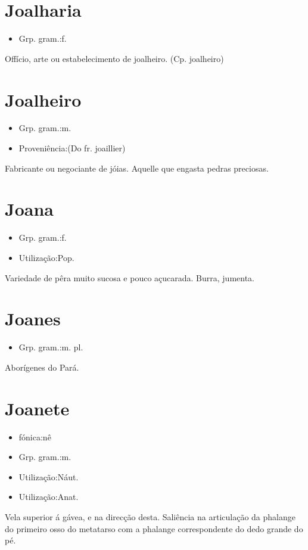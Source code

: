 \documentclass{article}
\begin{document}
\section{Joalharia}
\begin{itemize}
\item {Grp. gram.:f.}
\end{itemize}
Offício, arte ou estabelecimento de joalheiro.
(Cp. \textunderscore joalheiro\textunderscore )
\section{Joalheiro}
\begin{itemize}
\item {Grp. gram.:m.}
\end{itemize}
\begin{itemize}
\item {Proveniência:(Do fr. \textunderscore joaillier\textunderscore )}
\end{itemize}
Fabricante ou negociante de jóias.
Aquelle que engasta pedras preciosas.
\section{Joana}
\begin{itemize}
\item {Grp. gram.:f.}
\end{itemize}
\begin{itemize}
\item {Utilização:Pop.}
\end{itemize}
Variedade de pêra muito sucosa e pouco açucarada.
Burra, jumenta.
\section{Joanes}
\begin{itemize}
\item {Grp. gram.:m. pl.}
\end{itemize}
Aborígenes do Pará.
\section{Joanete}
\begin{itemize}
\item {fónica:nê}
\end{itemize}
\begin{itemize}
\item {Grp. gram.:m.}
\end{itemize}
\begin{itemize}
\item {Utilização:Náut.}
\end{itemize}
\begin{itemize}
\item {Utilização:Anat.}
\end{itemize}
Vela superior á gávea, e na direcção desta.
Saliência na articulação da phalange do primeiro osso do metatarso com a phalange correspondente do dedo grande do pé.
\end{document}
